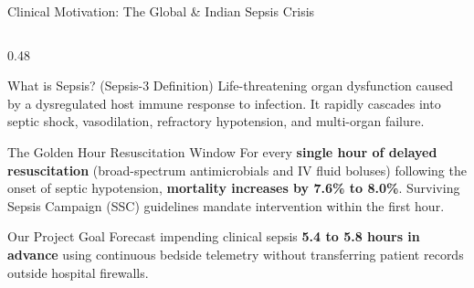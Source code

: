 \documentclass[aspectratio=169, 10pt]{beamer}
\begin{document}
\begin{frame}{Clinical Motivation: The Global \& Indian Sepsis Crisis}
    \begin{columns}[t]
        \begin{column}{0.48\textwidth}
            \begin{block}{What is Sepsis? (Sepsis-3 Definition)}
                \scriptsize
                Life-threatening organ dysfunction caused by a dysregulated host immune response to infection. It rapidly cascades into septic shock, vasodilation, refractory hypotension, and multi-organ failure.
            \end{block}
            
            \begin{alertblock}{The Golden Hour Resuscitation Window}
                \scriptsize
                For every \textbf{single hour of delayed resuscitation} (broad-spectrum antimicrobials and IV fluid boluses) following the onset of septic hypotension, \textbf{mortality increases by 7.6\% to 8.0\%}. Surviving Sepsis Campaign (SSC) guidelines mandate intervention within the first hour.
            \end{alertblock}
            
            \begin{exampleblock}{Our Project Goal}
                \scriptsize
                Forecast impending clinical sepsis \textbf{5.4 to 5.8 hours in advance} using continuous bedside telemetry without transferring patient records outside hospital firewalls.
            \end{exampleblock}
        \end{column}
        

\end{columns}
\end{frame}
\end{document}
